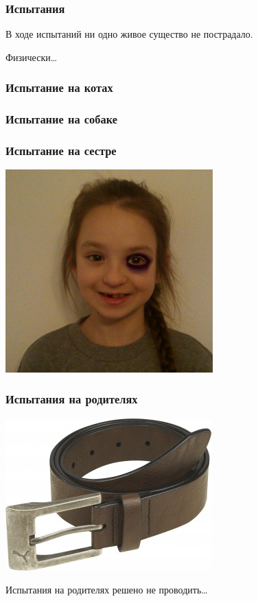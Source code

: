\begin{frame}
    \frametitle{Испытания \myDevice}
    \begin{center}
        В ходе испытаний ни одно живое существо не пострадало.

        Физически\ldots    
    \end{center}    
\end{frame}

\begin{frame}
    \frametitle{Испытание на котах}
\end{frame}

\begin{frame}
    \frametitle{Испытание на собаке}
\end{frame}

\begin{frame}
    \frametitle{Испытание на сестре}
    
    \begin{center}
        \includegraphics[width=0.6\textwidth]{fig/nastyaWork}
    \end{center}
\end{frame}

\begin{frame}
    \frametitle{Испытания на родителях}
    
    \begin{center}
        \includegraphics[width=.6\textwidth]{fig/belt}
    \end{center}
    
    Испытания на родителях решено не проводить\ldots
\end{frame}


